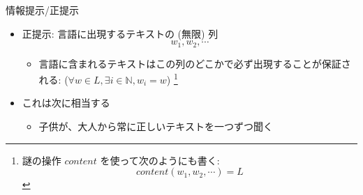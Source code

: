 \documentclass[professionalfont, 12pt, dvipdfmx, default, cjk]{beamer}
\begin{document}
\begin{frame}{情報提示/正提示}

\begin{itemize}
\itemsep1pt\parskip0pt
\item
  正提示: 言語に出現するテキストの (無限) 列 \vspace*{-2mm}
  \[w_1, w_2, \cdots\]

  \begin{itemize}
  \itemsep1pt\parskip0pt
  \item
    言語に含まれるテキストはこの列のどこかで必ず出現することが保証される:
    (\(\forall w \in L, \exists i \in \mathbb{N}, w_i = w\)) \footnote{
    謎の操作 $content$ を使って次のようにも書く:
    $$content(w_1, w_2, \cdots) = L$$
    }
  \end{itemize}
\end{itemize}

\pause
\small

\begin{itemize}
\itemsep1pt\parskip0pt
\item
  これは次に相当する

  \begin{itemize}
  \itemsep1pt\parskip0pt
  \item
    子供が、大人から常に正しいテキストを一つずつ聞く
  \end{itemize}
\end{itemize}

\end{frame}
\end{document}
